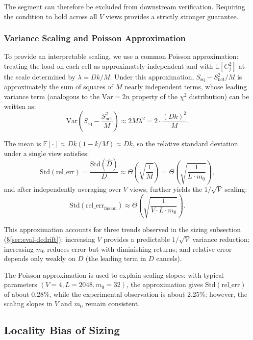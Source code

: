 The segment can therefore be excluded from downstream verification. Requiring the condition to hold across all $V$ views provides a strictly stronger guarantee.


\subsubsection{Variance Scaling and Poisson Approximation}

To provide an interpretable scaling, we use a common Poisson approximation: treating the load on each cell as approximately independent and with $\mathbb{E}[C_j^2]$ at the scale determined by $\lambda=Dk/M$. Under this approximation, $S_{\text{sq}}-S_{\text{net}}^2/M$ is approximately the sum of squares of $M$ nearly independent terms, whose leading variance term (analogous to the $\mathrm{Var}=2n$ property of the $\chi^2$ distribution) can be written as:
\[
\mathrm{Var}\!\left(S_{\text{sq}}-\frac{S_{\text{net}}^2}{M}\right)
\approx 2M\lambda^2
=2\cdot \frac{(Dk)^2}{M}.
\]

The mean is $\mathbb{E}[\cdot]\approx Dk(1-k/M)\approx Dk$, so the relative standard deviation under a single view satisfies:
\[
\mathrm{Std}(\mathrm{rel\_err})=\frac{\mathrm{Std}(\hat D)}{D}
\approx \Theta\!\left(\sqrt{\frac{1}{M}}\right)
=\Theta\!\left(\sqrt{\frac{1}{L\cdot m_0}}\right),
\]
and after independently averaging over $V$ views, further yields the $1/\sqrt{V}$ scaling:
\[
\mathrm{Std}(\mathrm{rel\_err}_{\text{fusion}})\approx \Theta\!\left(\sqrt{\frac{1}{V\cdot L\cdot m_0}}\right).
\]

This approximation accounts for three trends observed in the sizing subsection (\S\ref{sec:eval-dedrift}): increasing $V$ provides a predictable $1/\sqrt{V}$ variance reduction; increasing $m_0$ reduces error but with diminishing returns; and relative error depends only weakly on $D$ (the leading term in $D$ cancels).

The Poisson approximation is used to explain scaling slopes: with typical parameters $(V=4, L=2048, m_0=32)$, the approximation gives $\mathrm{Std}(\mathrm{rel\_err})$ of about 0.28\%, while the experimental observation is about 2.25\%; however, the scaling slopes in $V$ and $m_0$ remain consistent.

\subsection{Locality Bias of Sizing}
\label{sec:appendix-sizing-bias}

